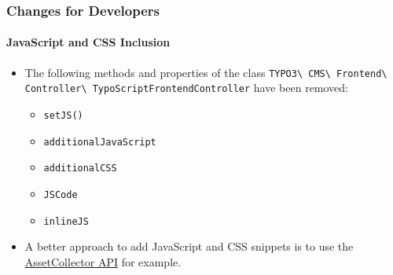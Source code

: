 %

\begin{frame}[fragile]
	\frametitle{Changes for Developers}
	\framesubtitle{JavaScript and CSS Inclusion}


	\begin{itemize}
		\item The following methods and properties of the class
			\smaller\texttt{TYPO3\textbackslash
				CMS\textbackslash
				Frontend\textbackslash
				Controller\textbackslash
				TypoScriptFrontendController}\normalsize\newline
			have been removed:

			\begin{itemize}
				\item \texttt{setJS()}
				\item \texttt{additionalJavaScript}
				\item \texttt{additionalCSS}
				\item \texttt{JSCode}
				\item \texttt{inlineJS}
			\end{itemize}

		\item A better approach to add JavaScript and CSS snippets is to use the
			\href{https://docs.typo3.org/m/typo3/reference-coreapi/master/en-us/ApiOverview/Assets/Index.html}{AssetCollector API}
			for example.
	\end{itemize}

\end{frame}

